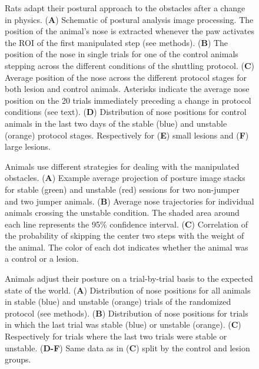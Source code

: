 \begin{figure}
\centering

\caption{Rats adapt their postural approach to the obstacles after a change in physics. (\textbf{A}) Schematic of postural analysis image processing. The position of the animal's nose is extracted whenever the paw activates the ROI of the first manipulated step (see methods). (\textbf{B}) The position of the nose in single trials for one of the control animals stepping across the different conditions of the shuttling protocol. (\textbf{C}) Average position of the nose across the different protocol stages for both lesion and control animals. Asterisks indicate the average nose position on the 20 trials immediately preceding a change in protocol conditions (see text). (\textbf{D}) Distribution of nose positions for control animals in the last two days of the stable (blue) and unstable (orange) protocol stages. Respectively for (\textbf{E}) small lesions and (\textbf{F}) large lesions.}
\label{fig:posture}
\end{figure}

\begin{figure}
\centering

\caption{Animals use different strategies for dealing with the manipulated obstacles. (\textbf{A}) Example average projection of posture image stacks for stable (green) and unstable (red) sessions for two non-jumper and two jumper animals. (\textbf{B}) Average nose trajectories for individual animals crossing the unstable condition. The shaded area around each line represents the 95\% confidence interval. (\textbf{C}) Correlation of the probability of skipping the center two steps with the weight of the animal. The color of each dot indicates whether the animal was a control or a lesion.}
\label{fig:jumping}
\end{figure}

\begin{figure}
\centering

\caption{Animals adjust their posture on a trial-by-trial basis to the expected state of the world. (\textbf{A}) Distribution of nose positions for all animals in stable (blue) and unstable (orange) trials of the randomized protocol (see methods). (\textbf{B}) Distribution of nose positions for trials in which the last trial was stable (blue) or unstable (orange). (\textbf{C}) Respectively for trials where the last two trials were stable or unstable. (\textbf{D-F}) Same data as in (\textbf{C}) split by the control and lesion groups.}
\label{fig:random}
\end{figure}

